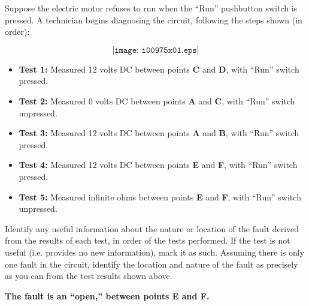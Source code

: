 

Suppose the electric motor refuses to run when the ``Run'' pushbutton switch is pressed.  A technician begins diagnosing the circuit, following the steps shown (in order):

$$\texttt{[image: i00975x01.eps]}$$

\begin{itemize}
\item{} {\bf Test 1:} Measured 12 volts DC between points {\bf C} and {\bf D}, with ``Run'' switch pressed.
\vskip 25pt
\item{} {\bf Test 2:} Measured 0 volts DC between points {\bf A} and {\bf C}, with ``Run'' switch unpressed.
\vskip 25pt
\item{} {\bf Test 3:} Measured 12 volts DC between points {\bf A} and {\bf B}, with ``Run'' switch pressed.
\vskip 25pt
\item{} {\bf Test 4:} Measured 12 volts DC between points {\bf E} and {\bf F}, with ``Run'' switch pressed.
\vskip 25pt
\item{} {\bf Test 5:} Measured infinite ohms between points {\bf E} and {\bf F}, with ``Run'' switch unpressed. 
\vskip 25pt
\end{itemize}

Identify any useful information about the nature or location of the fault derived from the results of each test, in order of the tests performed.  If the test is not useful (i.e. provides no new information), mark it as such.  Assuming there is only one fault in the circuit, identify the location and nature of the fault as precisely as you can from the test results shown above.







{\bf The fault is an ``open,'' between points E and F.}







